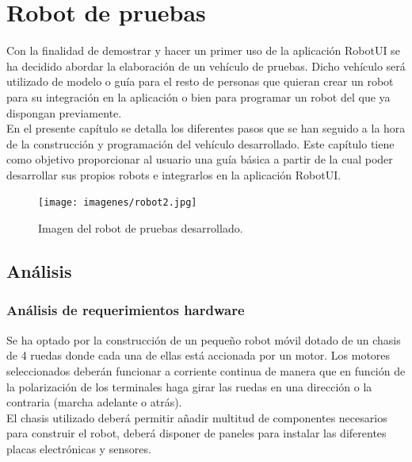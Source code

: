 \chapter{Robot de pruebas}
\label{chap:robot}

Con la finalidad de demostrar y hacer un primer uso de la aplicación RobotUI se ha decidido abordar la elaboración de un vehículo de pruebas. Dicho vehículo será utilizado de modelo o guía para el 
resto de personas que quieran crear un robot para su integración en la aplicación o bien para programar un robot del que ya dispongan previamente.\\

En el presente capítulo se detalla los diferentes pasos que se han seguido a la hora de la construcción y programación del vehículo desarrollado. Este capítulo tiene como objetivo proporcionar al usuario
una guía básica a partir de la cual poder desarrollar sus propios robots e integrarlos en la aplicación RobotUI.\\


\begin{figure}[H]
  \begin{center}
    \texttt{[image: imagenes/robot2.jpg]}
  \end{center}
  \caption{Imagen del robot de pruebas desarrollado.}
  \label{robot:robot02}
\end{figure}


\section{Análisis}
\label{sec:analisis}

\subsection{Análisis de requerimientos hardware}
\label{sec:requerimientos-hardware}

Se ha optado por la construcción de un  pequeño robot móvil dotado de un chasis de 4 ruedas donde cada una de ellas está accionada por un motor. Los motores seleccionados deberán funcionar a 
corriente continua de manera que en función de la polarización de los terminales haga girar las ruedas en una dirección o la contraria (marcha adelante o atrás).\\

El chasis utilizado deberá permitir añadir multitud de componentes necesarios para construir el robot, deberá disponer de paneles para instalar las diferentes
placas electrónicas y sensores.\\

